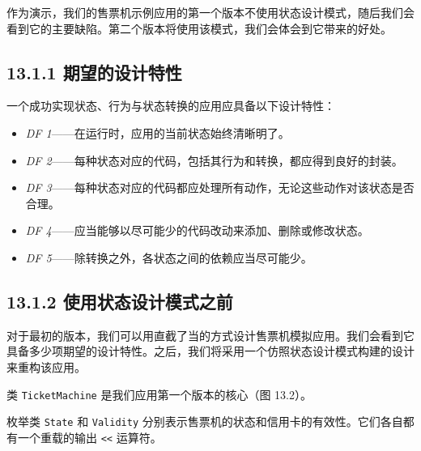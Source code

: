 作为演示，我们的售票机示例应用的第一个版本不使用状态设计模式，随后我们会看到它的主要缺陷。第二个版本将使用该模式，我们会体会到它带来的好处。

\subsection{13.1.1 期望的设计特性}

一个成功实现状态、行为与状态转换的应用应具备以下设计特性：

\begin{itemize}
\item \emph{DF 1}——在运行时，应用的当前状态始终清晰明了。
\item \emph{DF 2}——每种状态对应的代码，包括其行为和转换，都应得到良好的封装。
\item \emph{DF 3}——每种状态对应的代码都应处理所有动作，无论这些动作对该状态是否合理。
\item \emph{DF 4}——应当能够以尽可能少的代码改动来添加、删除或修改状态。
\item \emph{DF 5}——除转换之外，各状态之间的依赖应当尽可能少。
\end{itemize}

\subsection{13.1.2 使用状态设计模式之前}

对于最初的版本，我们可以用直截了当的方式设计售票机模拟应用。我们会看到它具备多少项期望的设计特性。之后，我们将采用一个仿照状态设计模式构建的设计来重构该应用。

类 \texttt{Ticket\allowbreak{}Machine} 是我们应用第一个版本的核心（图 13.2）。


枚举类 \texttt{State} 和 \texttt{Validity} 分别表示售票机的状态和信用卡的有效性。它们各自都有一个重载的输出 \texttt{<<} 运算符。

